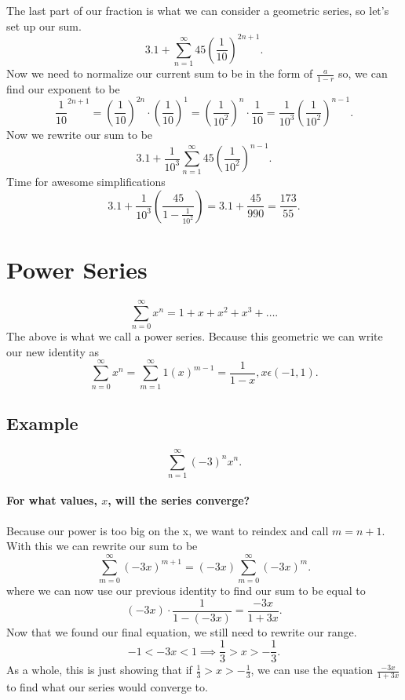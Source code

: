 The last part of our fraction is what we can consider a geometric series, so let's set up our sum.
\[
3.1+\sum_{ n=1 } ^{ \infty } 45\left( \frac{ 1 }{ 10 }  \right) ^{ 2n+1 }
.\] 
Now we need to normalize our current sum to be in the form of $ \frac{ a }{ 1-r } $ so, we can find our exponent to be 
\[
\frac{ 1 }{ 10 } ^{ 2n+1 }=\left( \frac{ 1 }{ 10 }  \right) ^{ 2n }\cdot \left( \frac{ 1 }{ 10 }  \right) ^{ 1 }=\left( \frac{ 1 }{ 10^2 }  \right) ^{ n }\cdot \frac{ 1 }{ 10 } =\frac{ 1 }{ 10^3 } \left( \frac{ 1 }{ 10^2 }  \right)^{ n-1 }
.\] 
Now we rewrite our sum to be 
\[
3.1+\frac{ 1 }{ 10^3 } \sum_{ n=1 } ^{ \infty } 45\left( \frac{ 1 }{ 10^2 }  \right) ^{ n-1 }
.\] 
Time for awesome simplifications
\[
3.1+\frac{ 1 }{ 10^3 } \left( \frac{ 45 }{ 1-\frac{ 1 }{ 10^2 }  }  \right)=3.1+ \frac{ 45 }{ 990 } = \frac{ 173 }{ 55 }  
.\] 

\section{Power Series}%
\label{sec:Power Series}
\[
\sum_{ n= 0 } ^{ \infty } x^{ n } = 1 + x + x^2+x^3+ \ldots
.\] 
The above is what we call a power series. Because this geometric we can write our new identity as 
\[
\sum_{ n=0 } ^{ \infty } x^{ n }=\sum_{ m=1 } ^{ \infty } 1\left( x \right) ^{ m-1 }=\frac{ 1 }{ 1-x } ,x\epsilon\left( -1,1 \right) 
.\] 

\subsection{Example}%
\label{sub:Example}
\[
\sum_{ n=1 } ^{ \infty } \left( -3 \right) ^{ n }x^{ n }
.\] 
\paragraph{For what values, $ x $, will the series converge?}
Because our power is too big on the x, we want to reindex and call $ m=n+1 $. With this we can rewrite our sum to be 
\[
\sum_{ m=0 } ^{ \infty } \left( -3x \right) ^{ m+1 }=\left( -3x \right) \sum_{ m=0 } ^{ \infty } \left( -3x \right) ^{ m }
.\] 
where we can now use our previous identity to find our sum to be equal to
\[
	\left( -3x \right) \cdot \frac{ 1 }{ 1-\left( -3x \right)  } = \frac{ -3x }{ 1+3x }
.\] 
Now that we found our final equation, we still need to rewrite our range. 
\[
-1<-3x<1 \implies \frac{ 1 }{ 3 } >x>-\frac{ 1 }{ 3 } 
.\] 
As a whole, this is just showing that if $ \frac{ 1 }{ 3 } >x>-\frac{ 1 }{ 3 }  $, we can use the equation $ \frac{ -3x }{ 1+3x } $ to find what our series would converge to. 

